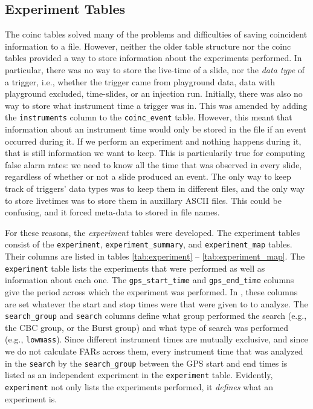 \subsection{Experiment Tables}
\label{sec:experiment_tables}

The coinc tables solved many of the problems and difficulties of saving coincident information to a file. However, neither the older table structure nor the coinc tables provided a way to store information about the experiments performed. In particular, there was no way to store the live-time of a slide, nor the \emph{data type} of a trigger, i.e., whether the trigger came from playground data, data with playground excluded, time-slides, or an injection run. Initially, there was also no way to store what instrument time a trigger was in. This was amended by adding the \texttt{instruments} column to the \texttt{coinc\_event} table. However, this meant that information about an instrument time would only be stored in the file if an event occurred during it. If we perform an experiment and nothing happens during it, that is still information we want to keep. This is particularily true for computing false alarm rates: we need to know all the time that was observed in every slide, regardless of whether or not a slide produced an event. The only way to keep track of triggers' data types was to keep them in different files, and the only way to store livetimes was to store them in auxillary ASCII files. This could be confusing, and it forced meta-data to stored in file names.

For these reasons, the \emph{experiment} tables were developed. The experiment tables consist of the \texttt{experiment}, \texttt{experiment\_summary}, and \texttt{experiment\_map} tables. Their columns are listed in tables \ref{tab:experiment} -- \ref{tab:experiment_map}. The \texttt{experiment} table lists the experiments that were performed as well as information about each one. The \texttt{gps\_start\_time} and \texttt{gps\_end\_time} columns give the period across which the experiment was performed. In \ihope, these columns are set whatever the start and stop times were that were given to \ihope to analyze. The \texttt{search\_group} and \texttt{search} columns define what group performed the search (e.g., the \ac{CBC} group, or the Burst group) and what type of search was performed (e.g., \texttt{lowmass}). Since different instrument times are mutually exclusive, and since we do not calculate \acp{FAR} across them, every instrument time that was analyzed in the \texttt{search} by the \texttt{search\_group} between the GPS start and end times is listed as an independent experiment in the \texttt{experiment} table. Evidently, \texttt{experiment} not only lists the experiments performed, it \emph{defines} what an experiment is.

